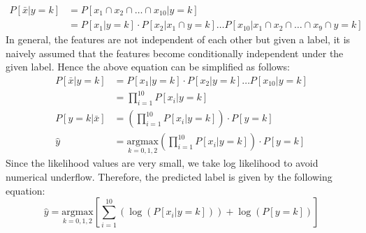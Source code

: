 \documentclass[12pt, a4paper, twoside]{article}
\begin{document}
\begin{align}
	P [\bar{x} | y=k] &= P [x_1 \cap x_2 \cap \dots \cap x_{10} | y=k] \\
	&= P [x_1 | y=k] \cdot P[x_2 | x_1 \cap y=k] \dots P[x_10 | x_1 \cap x_2 \cap \dots \cap x_9 \cap y=k]
\end{align}
In general, the features are not independent of each other but given a label, it is naively assumed that the features become conditionally independent under the given label. Hence the above equation can be simplified as follows:
\begin{align}
	P [\bar{x} | y=k] &= P[x_1 | y=k] \cdot P[x_2 | y=k] \dots P[x_{10} | y=k] \\
	&= \prod_{i = 1}^{10} P[x_i | y = k] \\
	P [y=k | \bar{x}] &= \left(  \prod_{i = 1}^{10} P[x_i | y = k] \right) \cdot P[y=k] \\
	\hat{y} &= \underset{k = 0, 1, 2}{\text{argmax}} \left(  \prod_{i = 1}^{10} P[x_i | y = k] \right) \cdot P[y=k]
\end{align}  
Since the likelihood values are very small, we take log likelihood to avoid numerical underflow. Therefore, the predicted label is given by the following equation\cite{ddl_book}:
\begin{equation}\label{E:main}
	\hat{y} = \underset{k = 0, 1, 2}{\text{argmax}} \left[ \sum_{i = 1}^{10} \left( \log (P[x_i | y = k]) \right) + \log (P[y=k]) \right]
\end{equation}
\end{document}
